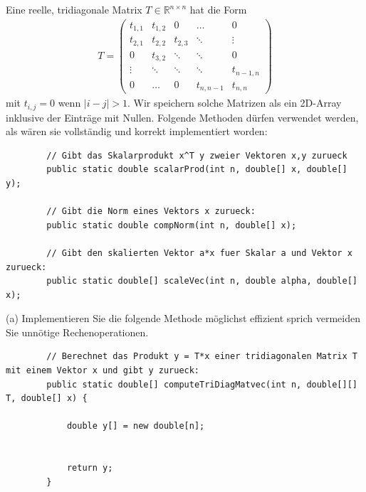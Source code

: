 \documentclass{scrartcl}
\begin{document}
%	
%	



	Eine reelle, tridiagonale Matrix $T \in \mathbb{R}^{n \times n}$ hat die Form
	\begin{align*}
		T = \begin{pmatrix}
			t_{1,1} & t_{1,2} & 0 & \dots & 0 \\
			t_{2,1} & t_{2,2} & t_{2,3} & \ddots & \vdots \\
			0 & t_{3,2} & \ddots & \ddots & 0 \\
			\vdots & \ddots & \ddots & \ddots & t_{n-1,n} \\
			0 & \dots & 0 & t_{n,n-1} & t_{n,n}
		\end{pmatrix}
	\end{align*}
	mit $t_{i,j}  = 0$ wenn $|i-j| > 1$. Wir speichern solche Matrizen als ein 2D-Array inklusive der Einträge mit Nullen.
	\n 
	Folgende Methoden dürfen verwendet werden, als wären sie vollständig und korrekt implementiert worden:		
	\begin{lstlisting}
		// Gibt das Skalarprodukt x^T y zweier Vektoren x,y zurueck
		public static double scalarProd(int n, double[] x, double[] y);
		
		// Gibt die Norm eines Vektors x zurueck:
		public static double compNorm(int n, double[] x);
		
		// Gibt den skalierten Vektor a*x fuer Skalar a und Vektor x zurueck:
		public static double[] scaleVec(int n, double alpha, double[] x);
	\end{lstlisting}
	\lbreak
	(a) 
	Implementieren Sie die folgende Methode möglichst effizient sprich vermeiden Sie unnötige Rechenoperationen.
	\begin{lstlisting}
		// Berechnet das Produkt y = T*x einer tridiagonalen Matrix T mit einem Vektor x und gibt y zurueck:
		public static double[] computeTriDiagMatvec(int n, double[][] T, double[] x) {
		
			double y[] = new double[n];
		
		
			return y;
		}
	\end{lstlisting}
\end{document}
